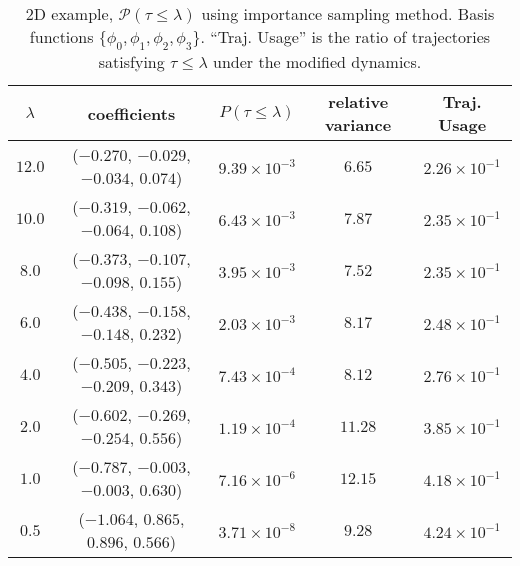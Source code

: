 \documentclass[final]{siamltex}
\begin{document}
\begin{table}[htbp]
  \begin{tabular*}{0.9\textwidth}{@{\extracolsep{\fill}}ccccc}
    \hline
    \hline
    $\lambda$ & coefficients & $P(\tau \le \lambda)$ & relative variance &
    Traj. Usage  \\
    \hline
    $12.0$ & ($-0.270$, $-0.029$, $-0.034$, $0.074$) & $9.39 \times 10^{-3}$ & $6.65$ & $2.26\times 10^{-1}$  \\
    $10.0$ & ($-0.319$, $-0.062$, $-0.064$, $0.108$) & $6.43\times 10^{-3}$ & $7.87$ & $2.35\times 10^{-1}$ \\
    $8.0$ & ($-0.373$,  $-0.107$, $-0.098$, $0.155$) & $3.95\times 10^{-3}$ & $7.52$ & $2.35\times 10^{-1}$ \\
    $6.0$ & ($-0.438$,  $-0.158$, $-0.148$, $0.232$) & $2.03\times 10^{-3}$ & $8.17$ & $2.48\times 10^{-1}$ \\
    $4.0$ & ($-0.505$,  $-0.223$, $-0.209$, $0.343$) & $7.43\times 10^{-4}$ & $8.12$ & $2.76\times 10^{-1}$  \\
    $2.0$ & ($-0.602$,  $-0.269$, $-0.254$, $0.556$) & $1.19\times 10^{-4}$ & $11.28$ & $3.85\times 10^{-1}$  \\
    $1.0$ & ($-0.787$,  $-0.003$, $-0.003$, $0.630$) & $7.16\times 10^{-6}$ & $12.15$ & $4.18\times 10^{-1}$  \\
    $0.5$ & ($-1.064$, $0.865$, $0.896$, $0.566$) & $3.71\times 10^{-8}$ & $9.28$ & $4.24\times 10^{-1}$ \\
    \hline
    \hline
  \end{tabular*}
  \centering
  \caption{2D example, $\mathcal{P}(\tau \le \lambda)$ using importance
  sampling method. Basis functions $\{\phi_0, \phi_1, \phi_2, \phi_3\}$.
``Traj. Usage'' is the ratio of trajectories satisfying $\tau \le \lambda$ under the modified dynamics. \label{tab-ex2-4}}
\end{table}
\end{document}
